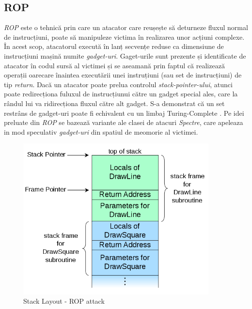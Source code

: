 \subsection{ROP}\label{sec:rop}

\emph{ROP} \cite{shacham2007geometry} este o tehnică prin care un atacator care
reușește să deturneze fluxul normal de instrucțiuni, poate să manipuleze
victima în realizarea unor acțiuni complexe. În acest scop, atacatorul execută
în lanț secvențe reduse ca dimensiune de instrucțiuni mașină numite
\emph{gadget-uri}. Gaget-urile sunt prezente și identificate de atacator în
codul sursă al victimei și se aseamană prin faptul că realizează operații
oarecare înaintea executării unei instruțiuni (sau set de instrucțiuni) de tip
\emph{return}. Dacă un atacator poate prelua controlul
\emph{stack-pointer-ului}, atunci poate redirecționa fuluxul de instrucțiunui
către un gadget special ales, care la rândul lui va ridirecționa fluxul către
alt gadget. S-a demonstrat că un set restrâns de gadget-uri poate fi echivalent
cu un limbaj Turing-Complete \cite{homescu2012microgadgets}. Pe idei preluate
din \emph{ROP} se bazează variante ale clasei de atacuri \emph{Spectre}, care
apeleaza in mod speculativ \emph{gadget-uri} din spatiul de meomorie al
victimei.

\begin{figure}[ht]
	\centering
	\includegraphics[width=0.9\textwidth]{images/rop_stack_layout.png}
  \caption{Stack Layout - ROP attack \cite{rop_figure}}
  \label{fig:rop_stack_layout}
\end{figure}
